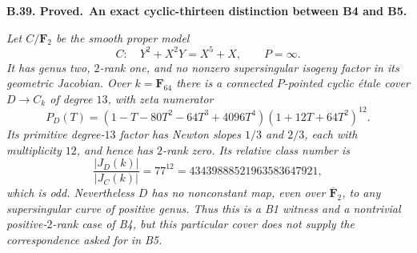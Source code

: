 \documentclass[11pt,a4paper]{article}
\newcommand{\F}{\mathbf F}
\newenvironment{claim}[3]{\par\medskip\noindent\hypertarget{#1}{\textbf{#1. #2.}}\ \textbf{#3.}\par\nopagebreak\smallskip\begingroup\itshape}{\endgroup\par\smallskip}
\begin{document}
\begin{claim}{B.39}{Proved}{An exact cyclic-thirteen distinction between B4 and B5}
Let $C/\F_2$ be the smooth proper model
\[
 C:\quad Y^2+X^2Y=X^5+X,
 \qquad P=\infty.
\]
It has genus two, $2$-rank one, and no nonzero supersingular
isogeny factor in its geometric Jacobian. Over $k=\F_{64}$
there is a connected $P$-pointed cyclic \'etale cover
$D\to C_k$ of degree $13$, with zeta numerator
\[
 P_D(T)=
 (1-T-80T^2-64T^3+4096T^4)
 (1+12T+64T^2)^{12}.
 \tag{B.LIT.7}
\]
Its primitive degree-$13$ factor has Newton slopes
$1/3$ and $2/3$, each with multiplicity $12$, and hence
has $2$-rank zero. Its relative class number is
\[
 \frac{|J_D(k)|}{|J_C(k)|}=77^{12}
       =43439888521963583647921,
\]
which is odd. Nevertheless $D$ has no nonconstant map,
even over $\overline{\F}_2$, to any supersingular curve
of positive genus. Thus this is a B1 witness and a
nontrivial positive-$2$-rank case of B4, but this particular
cover does not supply the correspondence asked for in B5.
\end{claim}
\end{document}
